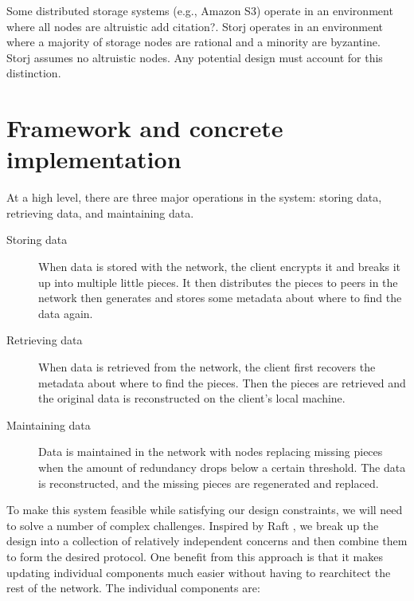 \documentclass[a4paper,10pt]{article} \usepackage[utf8]{inputenc}
\begin{document}
Some distributed storage systems (e.g., Amazon S3) operate in an environment
where all nodes are altruistic {\color{red}add citation?}.
Storj operates in an environment where a
majority of storage nodes are rational and a minority are byzantine. Storj
assumes no altruistic nodes. Any
potential design must account for this distinction.

\section{Framework and concrete implementation}\label{sec:framework}

At a high level, there are three major operations in the system: storing data,
retrieving data, and maintaining data.

\begin{description}

\item[Storing data] When data is stored with the network, the client encrypts
it and breaks it up into multiple little pieces. It then distributes the pieces 
to peers in the network then generates and stores some metadata about where to find the data
again.

\item[Retrieving data] When data is retrieved from the network, 
the client first recovers the metadata about where to find the pieces. 
Then the pieces are retrieved and the original data is reconstructed 
on the client's local machine.

\item[Maintaining data] Data is maintained in the network with nodes replacing
missing pieces when the amount of redundancy drops below a certain threshold.
The data is reconstructed, and the missing pieces are regenerated and replaced.

\end{description}

To make this system feasible while satisfying our design constraints, we will
need to solve a number of complex challenges. Inspired by Raft \cite{raft}, we
break up the design into a collection of relatively independent concerns and
then combine them to form the desired protocol. One benefit from this approach
is that it makes 
updating individual components much easier without having to rearchitect the rest 
of the network. The individual components are:
\end{document}
